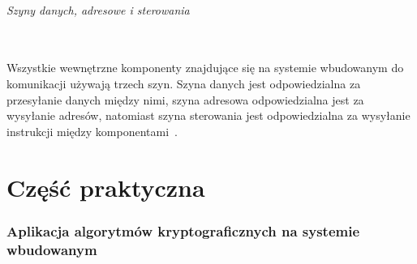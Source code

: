 \documentclass[12p]{article}
\begin{document}
\paragraph{Szyny danych, adresowe i sterowania} \mbox{} \\

Wszystkie wewnętrzne komponenty znajdujące się na systemie wbudowanym  do komunikacji używają trzech szyn. Szyna danych jest odpowiedzialna za przesyłanie danych między nimi, szyna adresowa odpowiedzialna jest za wysyłanie adresów, natomiast szyna sterowania jest odpowiedzialna za wysyłanie instrukcji między komponentami~\cite{es}.



\newpage
\part{Część praktyczna}
\section{Aplikacja algorytmów kryptograficznych na systemie wbudowanym}
\end{document}
